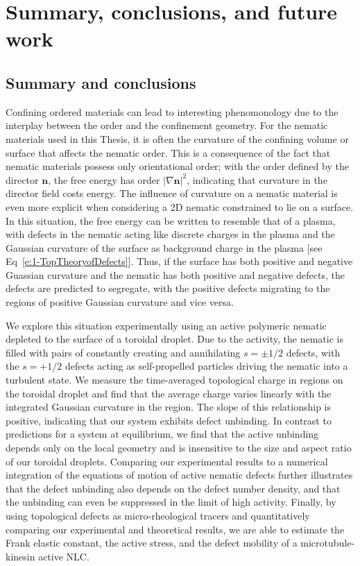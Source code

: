 \chapter{Summary, conclusions, and future work}

\section{Summary and conclusions}
Confining ordered materials can lead to interesting phenomonology due to the interplay between the order and the confinement geometry.
For the nematic materials used in this Thesis, it is often the curvature of the confining volume or surface that affects the nematic order.
This is a consequence of the fact that nematic materials possess only orientational order; with the order defined by the director $\mathbf{n}$, the free energy has order $|\nabla \mathbf{n}|^2$, indicating that curvature in the director field costs energy.
The influence of curvature on a nematic material is even more explicit when considering a 2D nematic constrained to lie on a surface.
In this situation, the free energy can be written to resemble that of a plasma, with defects in the nematic acting like discrete charges in the plasma and the Gaussian curvature of the surface as background charge in the plasma  [see Eq~\ref{e:1-TopTheoryofDefects}].
Thus, if the surface has both positive and negative Guassian curvature and the nematic has both positive and negative defects, the defects are predicted to segregate, with the positive defects migrating to the regions of positive Gaussian curvature and vice versa.

We explore this situation experimentally using an active polymeric nematic depleted to the surface of a toroidal droplet.
Due to the activity, the nematic is filled with pairs of constantly creating and annihilating $s = \pm 1/2$ defects, with the $s = +1/2$ defects acting as self-propelled particles driving the nematic into a turbulent state.
We measure the time-averaged topological charge in regions on the toroidal droplet and find that the average charge varies linearly with the integrated Gaussian curvature in the region.
The slope of this relationship is positive, indicating that our system exhibits defect unbinding.
In contrast to predictions for a system at equilibrium, we find that the active unbinding depends only on the local geometry and is insensitive to the size and aspect ratio of our toroidal droplets.
Comparing our experimental results to a numerical integration of the equations of motion of active nematic defects further illustrates that the defect unbinding also depends on the defect number density, and that the unbinding can even be suppressed in the limit of high activity.
Finally, by using topological defects as micro-rheological tracers and quantitatively comparing our experimental and theoretical results, we are able to estimate the Frank elastic constant, the active stress, and the defect mobility of a microtubule-kinesin active NLC.

